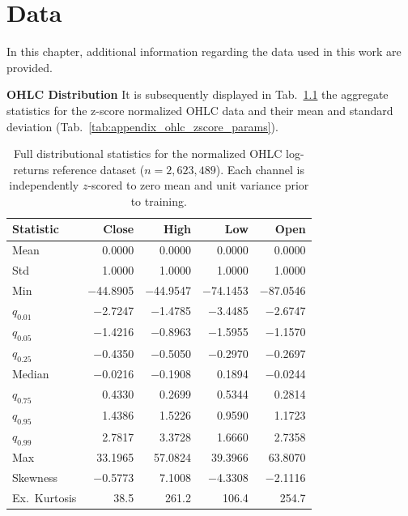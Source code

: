 \chapter{Data}
\label{app:ch:data_insights}
In this chapter, additional information regarding the data used in this work are provided.

\textbf{OHLC Distribution} \quad It is subsequently displayed in Tab.\ \ref{tab:appendix_ohlc_reference_norm} the aggregate statistics for the z-score normalized OHLC data and their mean and standard deviation (Tab.\ \ref{tab:appendix_ohlc_zscore_params}).

\begin{table}[htbp]
\centering
\footnotesize
\renewcommand{\arraystretch}{1.28}
\setlength{\tabcolsep}{6pt}
\begin{tabular}{l r r r r}
\toprule
\textbf{Statistic} & \textbf{Close} & \textbf{High} & \textbf{Low} & \textbf{Open} \\
\midrule
Mean          &  0.0000 & 0.0000 & 0.0000 &  0.0000 \\
Std           &  1.0000 &  1.0000 &  1.0000 &  1.0000 \\
Min           & $-$44.8905 & $-$44.9547 & $-$74.1453 & $-$87.0546 \\
$q_{0.01}$    & $-$2.7247 & $-$1.4785 & $-$3.4485 & $-$2.6747 \\
$q_{0.05}$    & $-$1.4216 & $-$0.8963 & $-$1.5955 & $-$1.1570 \\
$q_{0.25}$    & $-$0.4350 & $-$0.5050 & $-$0.2970 & $-$0.2697 \\
Median        & $-$0.0216 & $-$0.1908 &  0.1894 & $-$0.0244 \\
$q_{0.75}$    &  0.4330 &  0.2699 &  0.5344 &  0.2814 \\
$q_{0.95}$    &  1.4386 &  1.5226 &  0.9590 &  1.1723 \\
$q_{0.99}$    &  2.7817 &  3.3728 &  1.6660 &  2.7358 \\
Max           & 33.1965 & 57.0824 & 39.3966 & 63.8070 \\
Skewness      & $-$0.5773 &  7.1008 & $-$4.3308 & $-$2.1116 \\
Ex.\ Kurtosis & 38.5 & 261.2 & 106.4 & 254.7 \\
\bottomrule
\end{tabular}
\caption{Full distributional statistics for the normalized OHLC log-returns reference dataset
($n=2{,}623{,}489$). Each channel is independently $z$-scored to zero mean and unit
variance prior to training.}
\label{tab:appendix_ohlc_reference_norm}
\end{table}

